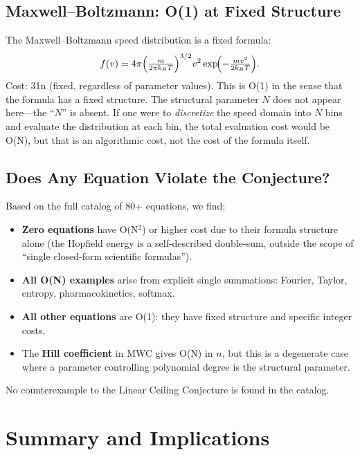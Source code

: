 \documentclass[12pt,a4paper]{article}
\theoremstyle{definition}
\begin{document}
\subsection{Maxwell--Boltzmann: O(1) at Fixed Structure}

The Maxwell--Boltzmann speed distribution is a fixed formula:
\[
  f(v) = 4\pi \Bigl(\tfrac{m}{2\pi k_B T}\Bigr)^{3/2}
         v^2 \exp\!\Bigl(-\tfrac{mv^2}{2k_BT}\Bigr).
\]
Cost: 31n (fixed, regardless of parameter values).  This is O(1) in
the sense that the formula has a fixed structure.  The structural
parameter $N$ does not appear here---the ``$N$'' is absent.  If one
were to \emph{discretize} the speed domain into $N$ bins and evaluate
the distribution at each bin, the total evaluation cost would be O(N),
but that is an algorithmic cost, not the cost of the formula itself.

\subsection{Does Any Equation Violate the Conjecture?}

Based on the full catalog of 80+ equations, we find:
\begin{itemize}
  \item \textbf{Zero equations} have O(N$^2$) or higher cost due to
        their formula structure alone (the Hopfield energy is a
        self-described double-sum, outside the scope of ``single
        closed-form scientific formulas'').
  \item \textbf{All O(N) examples} arise from explicit single
        summations: Fourier, Taylor, entropy, pharmacokinetics, softmax.
  \item \textbf{All other equations} are O(1): they have fixed structure
        and specific integer costs.
  \item The \textbf{Hill coefficient} in MWC gives O(N) in $n$, but
        this is a degenerate case where a parameter controlling
        polynomial degree is the structural parameter.
\end{itemize}

\noindent
No counterexample to the Linear Ceiling Conjecture is found in the catalog.

\section{Summary and Implications}
\label{sec:summary}
\end{document}
